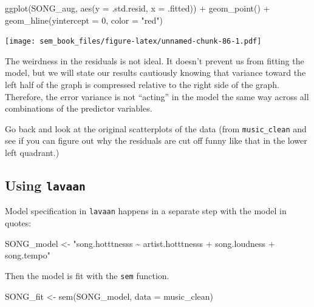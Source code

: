 \documentclass[
]{book}
\newenvironment{Shaded}{\begin{snugshade}}{\end{snugshade}}
\newcommand{\AttributeTok}[1]{\textcolor[rgb]{0.77,0.63,0.00}{#1}}
\newcommand{\DecValTok}[1]{\textcolor[rgb]{0.00,0.00,0.81}{#1}}
\newcommand{\FunctionTok}[1]{\textcolor[rgb]{0.00,0.00,0.00}{#1}}
\newcommand{\NormalTok}[1]{#1}
\newcommand{\OtherTok}[1]{\textcolor[rgb]{0.56,0.35,0.01}{#1}}
\newcommand{\SpecialCharTok}[1]{\textcolor[rgb]{0.00,0.00,0.00}{#1}}
\newcommand{\StringTok}[1]{\textcolor[rgb]{0.31,0.60,0.02}{#1}}
\begin{document}
\begin{Shaded}
\begin{Highlighting}[]
\FunctionTok{ggplot}\NormalTok{(SONG\_aug, }\FunctionTok{aes}\NormalTok{(}\AttributeTok{y =}\NormalTok{ .std.resid, }\AttributeTok{x =}\NormalTok{ .fitted)) }\SpecialCharTok{+}
    \FunctionTok{geom\_point}\NormalTok{() }\SpecialCharTok{+}
    \FunctionTok{geom\_hline}\NormalTok{(}\AttributeTok{yintercept =} \DecValTok{0}\NormalTok{, }\AttributeTok{color =} \StringTok{"red"}\NormalTok{)}
\end{Highlighting}
\end{Shaded}

\texttt{[image: sem\_book\_files/figure-latex/unnamed-chunk-86-1.pdf]}

The weirdness in the residuals is not ideal. It doesn't prevent us from fitting the model, but we will state our results cautiously knowing that variance toward the left half of the graph is compressed relative to the right side of the graph. Therefore, the error variance is not ``acting'' in the model the same way across all combinations of the predictor variables.

Go back and look at the original scatterplots of the data (from \texttt{music\_clean} and see if you can figure out why the residuals are cut off funny like that in the lower left quadrant.)

\hypertarget{multiple-r-lavaan}{%
\subsection{\texorpdfstring{Using \texttt{lavaan}}{Using lavaan}}\label{multiple-r-lavaan}}

Model specification in \texttt{lavaan} happens in a separate step with the model in quotes:

\begin{Shaded}
\begin{Highlighting}[]
\NormalTok{SONG\_model }\OtherTok{\textless{}{-}} \StringTok{"song.hotttnesss \textasciitilde{} artist.hotttnesss +}
\StringTok{    song.loudness + }
\StringTok{    song.tempo"} 
\end{Highlighting}
\end{Shaded}

Then the model is fit with the \texttt{sem} function.

\begin{Shaded}
\begin{Highlighting}[]
\NormalTok{SONG\_fit }\OtherTok{\textless{}{-}} \FunctionTok{sem}\NormalTok{(SONG\_model, }\AttributeTok{data =}\NormalTok{ music\_clean)}
\end{Highlighting}
\end{Shaded}
\end{document}
